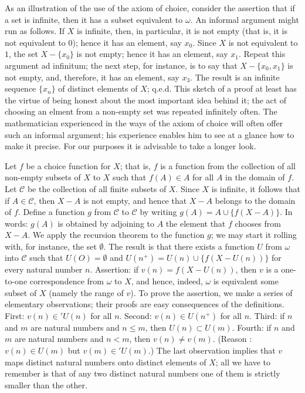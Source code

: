 As an illustration of the use of the axiom of choice, consider the assertion that if a set is infinite, then it has a subset equivalent to $\omega$. An informal argument might run as follows. If $X$ is infinite, then, in particular, it is not empty (that is, it is not equivalent to $0$); hence it has an element, say $x_{0}$. Since $X$ is not equivalent to $1$, the set $X - \{ x_{0} \}$ is not empty; hence it has an element, say $x_{1}$. Repeat this argument ad infinitum; the next step, for instance, is to say that $X - \{ x_{0}, x_{1} \}$ is not empty, and, therefore, it has an element, say $x_{3}$. The result is an infinite sequence $\{ x_{n} \}$ of distinct elements of $X$; q.e.d. This sketch of a proof at least has the virtue of being honest about the most important idea behind it; the act of choosing an elment from a non-empty set was repeated infinitely often. The mathematician experienced in the ways of the axiom of choice will often offer such an informal argument; his experience enables him to see at a glance how to make it precise. For our purposes it is advisable to take a longer look.

Let $f$ be a choice function for $X$; that is, $f$ is a function from the collection of all non-empty subsets of $X$ to $X$ such that $f(A) \in A$ for all $A$ in the domain of $f$. Let $\mathcal{C}$ be the collection of all finite subsets of $X$. Since $X$ is infinite, it follows that if $A \in \mathcal{C}$, then $X - A$ is not empty, and hence that $X - A$ belongs to the domain of $f$. Define a function $g$ from $\mathcal{C}$ to $\mathcal{C}$ by writing $g(A) = A \cup \{ f(X - A) \}$. In words: $g(A)$ is obtained by adjoining to $A$ the element that $f$ chooses from $X - A$. We apply the recursion theorem to the function $g$; we may start it rolling with, for instance, the set $ \emptyset $. The result is that there exists a function $U$ from $\omega$ into $\mathcal{C}$ such that $U(O) = \emptyset$ and $U(n^{+}) = U(n) \cup \{ f(X - U(n)) \}$ for every natural number $n$. Assertion: if $v(n) = f(X - U(n))$, then $v$ is a one-to-one correspondence from $\omega$ to $X$, and hence, indeed, $\omega$ is equivalent some subset of $X$ (namely the range of $v$). To prove the assertion, we make a series  of  elementary observations; their proofs are easy consequences of the definitions. First: $v(n) \in ' U(n)$ for all $n$. Second: $v(n) \in U(n^{+})$ for all $n$. Third: if $n$ and $m$ are natural numbers and $n \le m$, then $U(n) \subset U(m)$. Fourth: if $n$ and $m$ are natural numbers and $n < m$, then $v(n) \neq v(m)$.  (Reason : $v(n) \in U(m)$ but $v(m) \in ' U(m)$.) The last observation implies that $v$ maps distinct natural numbers onto distinct elements of $X$; all we have to remember is that of any two distinct natural numbers one of them is strictly smaller than the other. 


